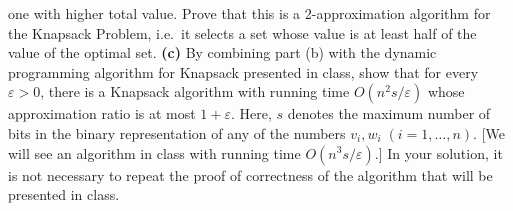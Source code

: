 \documentclass[12pt]{article}
\def\gap{0.1in}
\begin{document}
one with higher total value.  Prove that this is
a 2-approximation algorithm for the Knapsack Problem,
i.e.\ it selects a set whose value is at least half
of the value of the optimal set.
\vskip \gap
{\bf (c)}
By combining part (b) with the dynamic programming
algorithm for Knapsack presented in class, show that
for every $\varepsilon>0$, there is a Knapsack algorithm
with running time $O(n^2 s / \varepsilon)$ whose
approximation ratio is at most $1+\varepsilon.$
Here, $s$ denotes the maximum number of bits in the
binary representation of any of the numbers $v_i, w_i \;
(i=1,\ldots,n)$.
[We will see an  algorithm in class with
running time $O(n^3 s / \varepsilon).$]
In your solution, it is not necessary to repeat 
the proof of correctness of the algorithm that will be presented in class.



\end{document}
